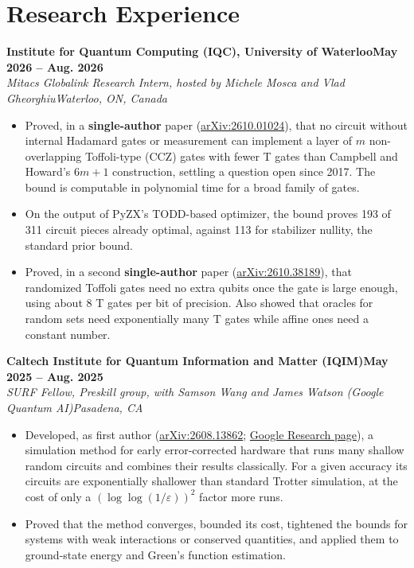 \documentclass[letterpaper,10pt]{article}
\newcommand{\entry}[4]{%
  \par\vspace{3pt}\noindent\textbf{#1}\hfill\textbf{\small #2}\\
  \textit{\small #3}\hfill\textit{\small #4}\par}
\begin{document}
\section{Research Experience}
\entry{Institute for Quantum Computing (IQC), University of Waterloo}{May 2026 -- Aug. 2026}{Mitacs Globalink Research Intern, hosted by Michele Mosca and Vlad Gheorghiu}{Waterloo, ON, Canada}
\begin{itemize}\small
  \item Proved, in a \textbf{single-author} paper (\href{https://arxiv.org/abs/2610.01024}{arXiv:2610.01024}), that no circuit
  without internal Hadamard gates or measurement can implement a layer of $m$ non-overlapping Toffoli-type (CCZ) gates
  with fewer T gates than Campbell and Howard's $6m+1$ construction, settling a question open since 2017. The bound is computable in polynomial time for a broad family of gates.
  \item On the output of PyZX's TODD-based optimizer, the bound proves 193 of 311 circuit pieces already optimal,
  against 113 for stabilizer nullity, the standard prior bound.
  \item Proved, in a second \textbf{single-author} paper (\href{https://arxiv.org/abs/2610.38189}{arXiv:2610.38189}), that randomized Toffoli gates need no extra qubits once
  the gate is large enough, using about 8 T gates per bit of precision. Also showed that oracles for random sets need
  exponentially many T gates while affine ones need a constant number.
\end{itemize}

\entry{Caltech Institute for Quantum Information and Matter (IQIM)}{May 2025 -- Aug. 2025}{SURF Fellow, Preskill group, with Samson Wang and James Watson (Google Quantum AI)}{Pasadena, CA}
\begin{itemize}\small
  \item Developed, as first author (\href{https://arxiv.org/abs/2608.13862}{arXiv:2608.13862}; \href{https://research.google/pubs/resource-efficient-quantum-matrix-processing-with-commutator-scaling/}{Google Research page}), a simulation method for early
  error-corrected hardware that runs many shallow random circuits and combines their results classically. For a given
  accuracy its circuits are exponentially shallower than standard Trotter simulation, at the cost of only a
  $(\log\log(1/\varepsilon))^2$ factor more runs.
  \item Proved that the method converges, bounded its cost, tightened the bounds for systems with weak interactions
  or conserved quantities, and applied them to ground-state energy and Green's function estimation.
\end{itemize}
\end{document}
